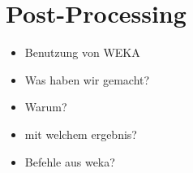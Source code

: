 \section{Post-Processing}

\begin{itemize}
    \item Benutzung von WEKA
    \item Was haben wir gemacht?
    \item Warum?
    \item mit welchem ergebnis?
    \item Befehle aus weka?
\end{itemize}


